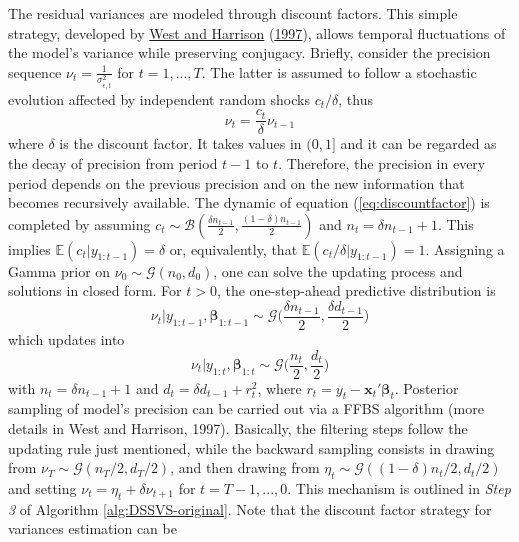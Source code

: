 \documentclass[
  12pt,
]{book}
\theoremstyle{break}
\theoremstyle{nonumberplain}
\begin{document}
The residual variances are modeled through discount factors. This simple
strategy, developed by \protect\hyperlink{ref-WH_1997}{West and
Harrison} (\protect\hyperlink{ref-WH_1997}{1997}), allows temporal
fluctuations of the model's variance while preserving conjugacy.
Briefly, consider the precision sequence
\(\nu_{t}=\frac{1}{\sigma^{2}_{\epsilon,t}}\) for \(t=1,...,T\). The
latter is assumed to follow a stochastic evolution affected by
independent random shocks \(c_{t}/\delta\), thus
\begin{equation}\label{eq:discountfactor}
\nu_{t}=\frac{c_{t}}{\delta}\nu_{t-1}
\end{equation} where \(\delta\) is the discount factor. It takes values
in \((0,1]\) and it can be regarded as the decay of precision from
period \(t-1\) to \(t\). Therefore, the precision in every period
depends on the previous precision and on the new information that
becomes recursively available. The dynamic of equation
(\ref{eq:discountfactor}) is completed by assuming
\(c_{t}\sim\mathcal{B}(\frac{\delta n_{t-1}}{2},\frac{(1-\delta)n_{t-1}}{2})\)
and \(n_{t}=\delta n_{t-1}+1\). This implies
\(\mathbb E(c_{t}|y_{1:t-1})=\delta\) or, equivalently, that
\(\mathbb E(c_{t}/\delta|y_{1:t-1})=1\). Assigning a Gamma prior on
\(\nu_{0}\sim\mathcal{G}(n_{0},d_{0})\), one can solve the updating
process and solutions in closed form. For \(t>0\), the one-step-ahead
predictive distribution is \begin{equation*}
\nu_{t}|y_{1:t-1},\boldsymbol{\beta}_{1:t-1}\sim\mathcal{G}\bigg(\frac{\delta n_{t-1}}{2},\frac{\delta d_{t-1}}{2}\bigg) 
\end{equation*} which updates into \begin{equation}\label{eq:factmod}
\nu_{t}|y_{1:t},\boldsymbol{\beta}_{1:t}\sim\mathcal{G}\bigg(\frac{n_{t}}{2},\frac{ d_{t}}{2}\bigg) 
\end{equation} with \(n_{t}=\delta n_{t-1}+1\) and
\(d_{t}=\delta d_{t-1}+r^{2}_{t}\), where
\(r_{t}=y_{t}-\boldsymbol{x}_{t}'\boldsymbol{\beta}_{t}\). Posterior
sampling of model's precision can be carried out via a FFBS algorithm
(more details in West and Harrison, 1997). Basically, the filtering
steps follow the updating rule just mentioned, while the backward
sampling consists in drawing from
\(\nu_{T}\sim\mathcal{G}(n_{T}/2,d_{T}/2)\), and then drawing from
\(\eta_{t}\sim\mathcal{G}((1-\delta)n_{t} / 2,d_{t}/2)\) and setting
\(\nu_{t}=\eta_{t}+\delta\nu_{t+1}\) for \(t=T-1,...,0\). This mechanism
is outlined in \emph{Step 3} of Algorithm \ref{alg:DSSVS-original}. Note
that the discount factor strategy for variances estimation can be
\end{document}
